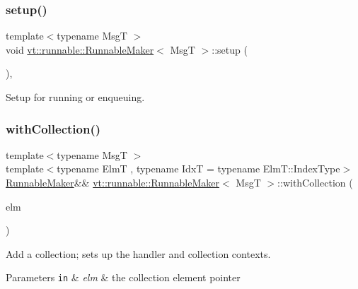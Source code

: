 \subsubsection{\texorpdfstring{setup()}{setup()}}
{\footnotesize\ttfamily template$<$typename MsgT $>$ \\
void \hyperlink{structvt_1_1runnable_1_1_runnable_maker}{vt\+::runnable\+::\+Runnable\+Maker}$<$ MsgT $>$\+::setup (\begin{DoxyParamCaption}{ }\end{DoxyParamCaption})\hspace{0.3cm}{\ttfamily [inline]}, {\ttfamily [private]}}



Setup for running or enqueuing. 

\mbox{\label{structvt_1_1runnable_1_1_runnable_maker_aed99a9b0607da59ab7ad7ee56255fcc8}} 
\subsubsection{\texorpdfstring{with\+Collection()}{withCollection()}}
{\footnotesize\ttfamily template$<$typename MsgT $>$ \\
template$<$typename ElmT , typename IdxT  = typename Elm\+T\+::\+Index\+Type$>$ \\
\hyperlink{structvt_1_1runnable_1_1_runnable_maker}{Runnable\+Maker}\&\& \hyperlink{structvt_1_1runnable_1_1_runnable_maker}{vt\+::runnable\+::\+Runnable\+Maker}$<$ MsgT $>$\+::with\+Collection (\begin{DoxyParamCaption}\item[{ElmT $\ast$}]{elm }\end{DoxyParamCaption})\hspace{0.3cm}{\ttfamily [inline]}}



Add a collection; sets up the handler and collection contexts. 


\begin{DoxyParams}[1]{Parameters}
\mbox{\tt in}  & {\em elm} & the collection element pointer \\
\hline
\end{DoxyParams}
\mbox{\label{structvt_1_1runnable_1_1_runnable_maker_aa547117a9c2e36d77f60712ec78eef58}} 

